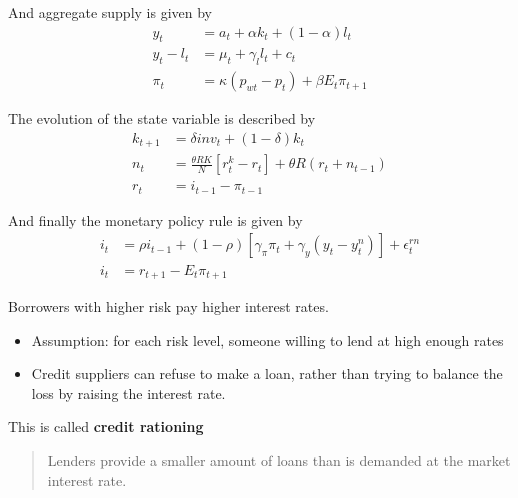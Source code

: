 \documentclass{beamer}
\begin{document}
\begin{frame}
  And aggregate supply is given by
\begin{align}
  y_t &= a_t + \alpha k_t + (1-\alpha)l_t\\
  y_t-l_t &= \mu_t + \gamma_l l_t + c_t\\
  \pi_t &= \kappa (p_{wt}-p_t) + \beta E_t \pi_{t+1}
\end{align}
\end{frame}

\begin{frame}
  The evolution of the state variable is described by
\begin{align}
  k_{t+1} &= \delta inv_t + (1-\delta)k_t\\
  n_t &= \frac{\theta RK}{N}[r_ t^k - r_t] + \theta R(r_t+n_{t-1})\\
  r_t &= i_{t-1} - \pi_{t-1}
\end{align}
\end{frame}

\begin{frame}
  And finally the monetary policy rule is given by
\begin{align}
  i_t &= \rho i_{t-1} + (1-\rho)[\gamma_{\pi}\pi_t + \gamma_y(y_t - y_t^n)]+ \epsilon_t^{rn}\\
  i_t &= r_{t+1} - E_t\pi_{t+1}
\end{align}
\end{frame}

\begin{frame}
Borrowers with higher risk pay higher interest rates.
\begin{itemize}
  \item Assumption: for each risk level, someone willing to lend at high enough rates
  \item Credit suppliers can refuse to make a loan, rather than trying to balance the loss by raising the interest rate. 
\end{itemize}
\medskip
This is called \textbf{credit rationing}
\begin{quote}
  Lenders provide a smaller amount of loans than is demanded at the market interest rate.
\end{quote}
\end{frame}
\end{document}
